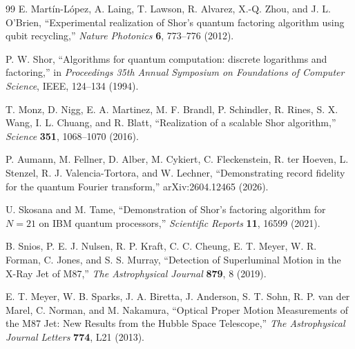 \documentclass[11pt,a4paper]{article}
\begin{document}
\begin{thebibliography}{99}
E. Mart{\'i}n-L{\'o}pez, A. Laing, T. Lawson, R. Alvarez, X.-Q. Zhou, and J. L. O'Brien, ``Experimental realization of Shor's quantum factoring algorithm using qubit recycling,'' \emph{Nature Photonics} \textbf{6}, 773--776 (2012).

P. W. Shor, ``Algorithms for quantum computation: discrete logarithms and factoring,'' in \emph{Proceedings 35th Annual Symposium on Foundations of Computer Science}, IEEE, 124--134 (1994).

T. Monz, D. Nigg, E. A. Martinez, M. F. Brandl, P. Schindler, R. Rines, S. X. Wang, I. L. Chuang, and R. Blatt, ``Realization of a scalable Shor algorithm,'' \emph{Science} \textbf{351}, 1068--1070 (2016).

P. Aumann, M. Fellner, D. Alber, M. Cykiert, C. Fleckenstein, R. ter Hoeven, L. Stenzel, R. J. Valencia-Tortora, and W. Lechner, ``Demonstrating record fidelity for the quantum Fourier transform,'' arXiv:2604.12465 (2026).

U. Skosana and M. Tame, ``Demonstration of Shor's factoring algorithm for \(N=21\) on IBM quantum processors,'' \emph{Scientific Reports} \textbf{11}, 16599 (2021).

B. Snios, P. E. J. Nulsen, R. P. Kraft, C. C. Cheung, E. T. Meyer, W. R. Forman, C. Jones, and S. S. Murray, ``Detection of Superluminal Motion in the X-Ray Jet of M87,'' \emph{The Astrophysical Journal} \textbf{879}, 8 (2019).

E. T. Meyer, W. B. Sparks, J. A. Biretta, J. Anderson, S. T. Sohn, R. P. van der Marel, C. Norman, and M. Nakamura, ``Optical Proper Motion Measurements of the M87 Jet: New Results from the Hubble Space Telescope,'' \emph{The Astrophysical Journal Letters} \textbf{774}, L21 (2013).
\end{thebibliography}
\end{document}
